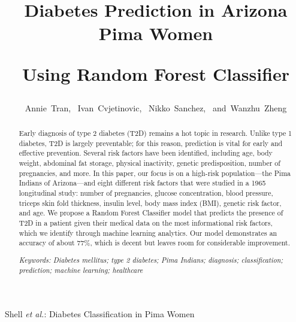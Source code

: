 \documentclass[journal]{IEEEtran}
\begin{document}
%
\title{Diabetes Prediction in Arizona Pima Women
 
Using Random Forest Classifier}
%
%
%

\author{Annie~Tran,~
        Ivan~Cvjetinovic,~
        Nikko~Sanchez,~
        and~Wanzhu~Zheng}%

%
{Shell \MakeLowercase{\textit{et al.}}: Diabetes Classification in Pima Women}

\maketitle

\begin{abstract}
Early diagnosis of type 2 diabetes (T2D) remains a hot topic in research. Unlike type 1 diabetes, T2D is largely preventable; for this reason, prediction is vital for early and effective prevention. Several risk factors have been identified, including age, body weight, abdominal fat storage, physical inactivity, genetic predisposition, number of pregnancies, and more. In this paper, our focus is on a high-risk population—the Pima Indians of Arizona—and eight different risk factors that were studied in a 1965 longitudinal study: number of pregnancies, glucose concentration, blood pressure, triceps skin fold thickness, insulin level, body mass index (BMI), genetic risk factor, and age. We propose a Random Forest Classifier model that predicts the presence of T2D in a patient given their medical data on the most informational risk factors, which we identify through machine learning analytics. Our model demonstrates an accuracy of about 77\%, which is decent but leaves room for considerable improvement.

\textit{Keywords: Diabetes mellitus; type 2 diabetes; Pima Indians; diagnosis; classification; prediction; machine learning; healthcare}
\end{abstract}
\end{document}

